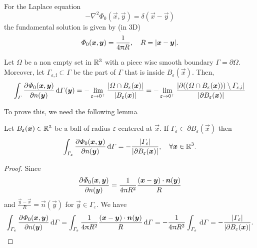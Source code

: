 \documentclass[b5paper, twoside, 11pt]{book}
\begin{document}
\pagestyle{empty}
For the Laplace equation
\begin{equation}\label{Eq3:Laplace}
	-\nabla^2\Phi_0(\vec{x},\vec{y}) = \delta(\vec{x}-\vec{y})
\end{equation}
the fundamental solution is given by (in 3D)
\begin{equation*}
	\Phi_0(\vec{x},\vec{y}) = \frac{1}{4\PI R},\quad R = |\vec{x}-\vec{y}|.
\end{equation*}
\begin{theorem}\label{Thm3:theorem}
	Let $\Omega$ be a non empty set in $\mathbb{R}^3$ with a piece wise smooth boundary $\Gamma=\partial\Omega$. Moreover, let $\Gamma_{\varepsilon,\mathrm{i}}\subset\Gamma$ be the part of $\Gamma$ that is inside $B_\varepsilon(\vec{x})$. Then,
	\begin{equation}\label{Eq3:theorem}
	\int_\Gamma \pderiv{\Phi_0(\vec{x},\vec{y})}{n(\vec{y})}\idiff\Gamma(\vec{y}) = -\lim_{\varepsilon\to 0^+}\frac{|\Omega\cap B_\varepsilon(\vec{x})|}{|B_\varepsilon(\vec{x})|} = -\lim_{\varepsilon\to 0^+}\frac{|\partial((\Omega\cap B_\varepsilon(\vec{x})))\setminus\Gamma_{\varepsilon,\mathrm{i}}|}{|\partial B_\varepsilon(\vec{x})|}
\end{equation}
\end{theorem}
To prove this, we need the following lemma
\begin{lemma}\label{Lem:Fund}
	Let $B_\varepsilon(\vec{x})\in \R^3$ be a ball of radius $\varepsilon$ centered at $\vec{x}$. If $\Gamma_\varepsilon\subset \partial B_\varepsilon(\vec{x})$ then
	\begin{equation*}
		\int_{\Gamma_\varepsilon}\pderiv{\Phi_0(\vec{x},\vec{y})}{n(\vec{y})}\idiff\Gamma = -\frac{|\Gamma_\varepsilon|}{|\partial  B_\varepsilon(\vec{x})|},\quad\forall\vec{x}\in\R^3.
	\end{equation*}
\end{lemma}
\begin{proof}
	Since
	\begin{equation*}
		\pderiv{\Phi_0(\vec{x},\vec{y})}{n(\vec{y})} = \frac{1}{4\PI R^2}\frac{(\vec{x}-\vec{y})\cdot\vec{n}(\vec{y})}{R}
	\end{equation*}
	and $\frac{\vec{y}-\vec{x}}{R} = \vec{n}(\vec{y})$ for $\vec{y}\in\Gamma_\varepsilon$. We have
	\begin{equation*}
		\int_{\Gamma_\varepsilon}\pderiv{\Phi_0(\vec{x},\vec{y})}{n(\vec{y})}\idiff\Gamma = \int_{\Gamma_\varepsilon}\frac{1}{4\PI R^2}\frac{(\vec{x}-\vec{y})\cdot\vec{n}(\vec{y})}{R}\idiff\Gamma = -\frac{1}{4\PI R^2}\int_{\Gamma_\varepsilon}\idiff\Gamma = -\frac{|\Gamma_\varepsilon|}{|\partial B_\varepsilon(\vec{x})|}.
	\end{equation*}
\end{proof}
\end{document}
